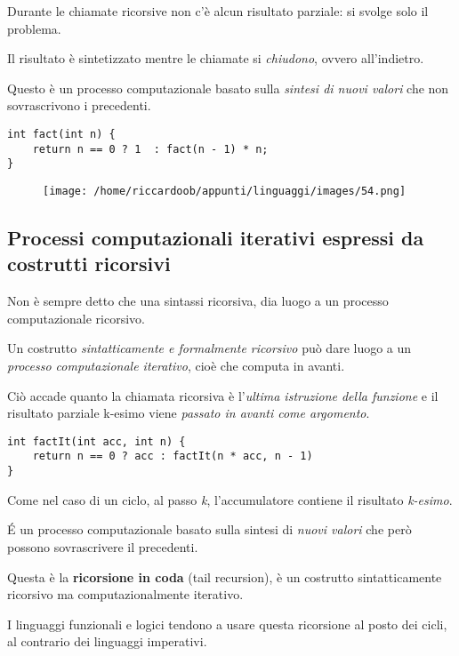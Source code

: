 Durante le chiamate ricorsive non c'è alcun risultato parziale: si svolge solo il problema.

Il risultato è sintetizzato mentre le chiamate si \textit{chiudono}, ovvero all'indietro.

Questo è un processo computazionale basato sulla \textit{sintesi di nuovi valori} che non sovrascrivono i precedenti.

\begin{verbatim}
int fact(int n) {
    return n == 0 ? 1  : fact(n - 1) * n;
}
\end{verbatim}
\begin{figure}[H]
    \centering
    \texttt{[image: /home/riccardoob/appunti/linguaggi/images/54.png]}
\end{figure}

\subsection{Processi computazionali iterativi espressi da costrutti ricorsivi}
Non è sempre detto che una sintassi ricorsiva, dia luogo a un processo computazionale ricorsivo.

Un costrutto \textit{sintatticamente e formalmente ricorsivo} può dare luogo a un \textit{processo computazionale iterativo}, cioè che computa in avanti.

Ciò accade quanto la chiamata ricorsiva è l'\textit{ultima istruzione della funzione} e il risultato parziale k-esimo viene \textit{passato in avanti come argomento}.

\begin{verbatim}
int factIt(int acc, int n) {
    return n == 0 ? acc : factIt(n * acc, n - 1)
}
\end{verbatim}

Come nel caso di un ciclo, al passo \textit{k}, l'accumulatore contiene il risultato \textit{k-esimo}.

É un processo computazionale basato sulla sintesi di \textit{nuovi valori} che però possono sovrascrivere il precedenti.

Questa è la \textbf{ricorsione in coda} (tail recursion), è un costrutto sintatticamente ricorsivo ma computazionalmente iterativo.

I linguaggi funzionali e logici tendono a usare questa ricorsione al posto dei cicli, al contrario dei linguaggi imperativi.

